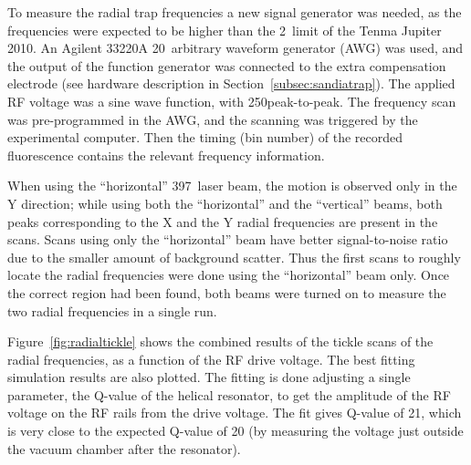 


To measure the radial trap frequencies a new signal generator was needed, as the frequencies were expected to be higher than the 2\MHz\, limit of the Tenma Jupiter 2010. An Agilent 33220A 20\MHz\, arbitrary waveform generator (AWG) was used, and the output of the function generator was connected to the extra compensation electrode (see hardware description in Section~\ref{subsec:sandiatrap}). The applied RF voltage was a sine wave function, with 250\mV peak-to-peak. The frequency scan was pre-programmed in the AWG, and the scanning was triggered by the experimental computer. Then the timing (bin number) of the recorded fluorescence contains the relevant frequency information. 

When using the ``horizontal'' 397\nm\, laser beam, the motion is observed only in the Y direction; while using both the ``horizontal'' and the ``vertical'' beams, both peaks corresponding to the X and the Y radial frequencies are present in the scans. Scans using only the ``horizontal'' beam have better signal-to-noise ratio due to the smaller amount of background scatter. Thus the first scans to roughly locate the radial frequencies were done using the ``horizontal'' beam only. Once the correct region had been found, both beams were turned on to measure the two radial frequencies in a single run.

Figure~\ref{fig:radialtickle} shows the combined results of the tickle scans of the radial frequencies, as a function of the RF drive voltage. The best fitting simulation results are also plotted. The fitting is done adjusting a single parameter, the Q-value of the helical resonator, to get the amplitude of the RF voltage on the RF rails from the drive voltage. The fit gives Q-value of 21, which is very close to the expected Q-value of 20 (by measuring the voltage just outside the vacuum chamber after the resonator).


